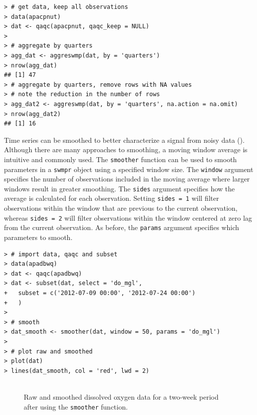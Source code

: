 \documentclass[10pt,letterpaper]{article}\usepackage[]{graphicx}\usepackage[]{color}
\makeatletter
\newenvironment{kframe}{%
 \def\at@end@of@kframe{}%
 \ifinner\ifhmode%
  \def\at@end@of@kframe{\end{minipage}}%
  \begin{minipage}{\columnwidth}%
 \fi\fi%
 \def\FrameCommand##1{\hskip\@totalleftmargin \hskip-\fboxsep
 \colorbox{shadecolor}{##1}\hskip-\fboxsep
     \hskip-\linewidth \hskip-\@totalleftmargin \hskip\columnwidth}%
 \MakeFramed {\advance\hsize-\width
   \@totalleftmargin\z@ \linewidth\hsize
   \@setminipage}}%
 {\par\unskip\endMakeFramed%
 \at@end@of@kframe}
\newenvironment{knitrout}{}{} %
\makeatother
\begin{document}
\begin{table}[!tbp]
\end{table}


\begin{knitrout}\small
{}\color{fgcolor}\begin{kframe}
\begin{verbatim}
> # get data, keep all observations
> data(apacpnut)
> dat <- qaqc(apacpnut, qaqc_keep = NULL)
> 
> # aggregate by quarters
> agg_dat <- aggreswmp(dat, by = 'quarters')
> nrow(agg_dat)
## [1] 47
> # aggregate by quarters, remove rows with NA values
> # note the reduction in the number of rows
> agg_dat2 <- aggreswmp(dat, by = 'quarters', na.action = na.omit)
> nrow(agg_dat2)
## [1] 16
\end{verbatim}
\end{kframe}
\end{knitrout}

Time series can be smoothed to better characterize a signal from noisy data ().  Although there are many approaches to smoothing, a moving window average is intuitive and commonly used.  The \texttt{smoother} function can be used to smooth parameters in a \texttt{swmpr} object using a specified window size.  The \texttt{window} argument specifies the number of observations included in the moving average where larger windows result in greater smoothing.  The \texttt{sides} argument specifies how the average is calculated for each observation.  Setting \texttt{sides = 1} will filter observations within the window that are previous to the current observation, whereas \texttt{sides = 2} will filter observations within the window centered at zero lag from the current observation. As before, the \texttt{params} argument specifies which parameters to smooth.

\begin{knitrout}\small
{}\color{fgcolor}\begin{kframe}
\begin{verbatim}
> # import data, qaqc and subset
> data(apadbwq)
> dat <- qaqc(apadbwq)
> dat <- subset(dat, select = 'do_mgl', 
+   subset = c('2012-07-09 00:00', '2012-07-24 00:00')
+   )
> 
> # smooth
> dat_smooth <- smoother(dat, window = 50, params = 'do_mgl')
> 
> # plot raw and smoothed
> plot(dat)
> lines(dat_smooth, col = 'red', lwd = 2)
\end{verbatim}
\end{kframe}\begin{figure}[!h]

{\centering \includegraphics[width=0.00\textwidth]{figure/smooth_ex-1} 

}

\caption[Raw and smoothed dissolved oxygen data for a two-week period after using the \texttt{smoother} function]{Raw and smoothed dissolved oxygen data for a two-week period after using the \texttt{smoother} function.}\label{fig:smooth_ex}
\end{figure}


\end{knitrout}
\end{document}
